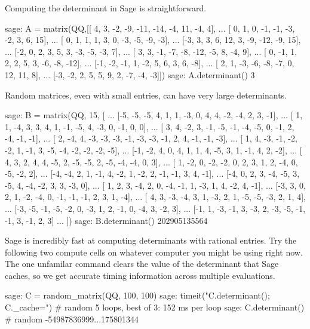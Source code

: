 Computing the determinant in Sage is straightforward.
%
\begin{sageexample}
sage: A = matrix(QQ,[[ 4,  3, -2, -9, -11, -14, -4,  11,  -4,   4],
...                  [ 0,  1,  0, -1,  -1,  -3, -2,   3,   6,  15],
...                  [ 0,  1,  1,  1,   3,   0, -3,  -5,  -9,  -3],
...                  [-3,  3,  3,  6,  12,   3, -9, -12,  -9,  15],
...                  [-2,  0,  2,  3,   5,   3, -3,  -5,  -3,   7],
...                  [ 3,  3, -1, -7,  -8, -12, -5,   8,  -4,   9],
...                  [ 0, -1,  1,  2,   2,   5,  3,  -6,  -8, -12],
...                  [-1, -2, -1,  1,  -2,   5,  6,   3,   6,  -8],
...                  [ 2,  1, -3, -6,  -8,  -7,  0,  12,  11,   8],
...                  [-3, -2,  2,  5,   5,   9,  2,  -7,  -4,  -3]])
sage: A.determinant()
3
\end{sageexample}
%
Random matrices, even with small entries, can have very large determinants.
%
\begin{sageexample}
sage: B = matrix(QQ,  15, [
...   [-5, -5, -5,  4,  1,  1, -3,  0,  4,  4, -2, -4,  2,  3, -1],
...   [ 1,  1, -4,  3,  3,  4,  1, -1, -5,  4, -3,  0, -1,  0,  0],
...   [ 3,  4, -2,  3, -1, -5, -1, -4, -5,  0, -1,  2, -4, -1, -1],
...   [ 2, -4,  4, -3, -3, -3, -1, -3, -3, -1,  2,  4, -1, -1, -3],
...   [ 1,  4, -3, -1, -2, -2,  1, -1,  3, -5, -4, -2, -2, -2, -5],
...   [-1, -2,  4,  0,  4,  1,  1,  4, -5,  3,  1, -1,  4,  2, -2],
...   [ 4,  3,  2,  4,  4, -5,  2, -5, -5,  2, -5, -4, -4,  0,  3],
...   [ 1, -2,  0, -2, -2,  0,  2,  3,  1,  2, -4,  0, -5, -2,  2],
...   [-4, -4,  2,  1, -1,  4, -2,  1, -2,  2, -1, -1,  3,  4, -1],
...   [-4,  0,  2,  3, -4, -5,  3, -5,  4, -4, -2,  3,  3, -3,  0],
...   [ 1,  2,  3, -4,  2,  0, -4, -1,  1, -3,  1,  4, -2,  4, -1],
...   [-3,  3,  0,  2,  1, -2, -4,  0, -1, -1, -1,  2,  3,  1, -4],
...   [ 4,  3, -3, -4,  3,  1, -3,  2,  1, -5, -5, -3,  2,  1,  4],
...   [-3, -5, -1, -5, -2,  0, -3,  1,  2, -1,  0, -4,  3, -2,  3],
...   [-1,  1, -3, -1,  3, -3,  2, -3, -5, -1, -1,  3, -1,  2,  3]
...                       ])
sage: B.determinant()
202905135564
\end{sageexample}
%
Sage is incredibly fast at computing determinants with rational entries.  Try the following two compute cells on whatever computer you might be using right now.  The one unfamilar command clears the value of the determinant that Sage caches, so we get accurate timing information across multiple evaluations.
%
\begin{sageexample}
sage: C = random_matrix(QQ, 100, 100)
sage: timeit("C.determinant(); C._cache={}")      # random
5 loops, best of 3: 152 ms per loop
sage: C.determinant()                             # random
-54987836999...175801344
\end{sageexample}
%
\begin{sageverbatim}
\end{sageverbatim}
%
